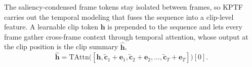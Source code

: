 %
%
%
%
%
%
%
%
%

The saliency-condensed frame tokens stay isolated between frames, so KPTF carries out the temporal modeling
that fuses the sequence into a clip-level feature.
A learnable clip token $\mathbf{h}$ is prepended to the sequence and lets every frame gather
cross-frame context through temporal attention, whose output at the clip position is the clip summary
$\hat{\mathbf{h}}$,
\begin{equation}
  \hat{\mathbf{h}} = \mathrm{TAttn}\!\big([\mathbf{h}, \tilde{\mathbf{c}}_1+\mathbf{e}_1, \tilde{\mathbf{c}}_2+\mathbf{e}_2, \ldots, \tilde{\mathbf{c}}_T+\mathbf{e}_T]\big)[0].
\end{equation}

